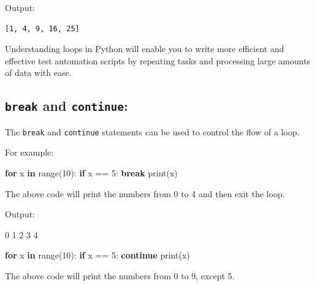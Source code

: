 \documentclass[
  paper=a4,
  ,captions=tableheading
]{scrartcl}
\newenvironment{Shaded}{}{}
\newcommand{\BuiltInTok}[1]{\textcolor[rgb]{0.00,0.50,0.00}{#1}}
\newcommand{\ControlFlowTok}[1]{\textcolor[rgb]{0.00,0.44,0.13}{\textbf{#1}}}
\newcommand{\DecValTok}[1]{\textcolor[rgb]{0.25,0.63,0.44}{#1}}
\newcommand{\ExtensionTok}[1]{#1}
\newcommand{\KeywordTok}[1]{\textcolor[rgb]{0.00,0.44,0.13}{\textbf{#1}}}
\newcommand{\NormalTok}[1]{#1}
\newcommand{\OperatorTok}[1]{\textcolor[rgb]{0.40,0.40,0.40}{#1}}
\begin{document}
Output:

\begin{verbatim}
[1, 4, 9, 16, 25]
\end{verbatim}

Understanding loops in Python will enable you to write more efficient
and effective test automation scripts by repeating tasks and processing
large amounts of data with ease.

\hypertarget{break-and-continue}{%
\subsection{\texorpdfstring{\texttt{break} and
\texttt{continue}:}{break and continue:}}\label{break-and-continue}}

The \texttt{break} and \texttt{continue} statements can be used to
control the flow of a loop.

For example:

\begin{Shaded}
\begin{Highlighting}[]
\ControlFlowTok{for}\NormalTok{ x }\KeywordTok{in} \BuiltInTok{range}\NormalTok{(}\DecValTok{10}\NormalTok{):}
    \ControlFlowTok{if}\NormalTok{ x }\OperatorTok{==} \DecValTok{5}\NormalTok{:}
        \ControlFlowTok{break}
    \BuiltInTok{print}\NormalTok{(x)}
\end{Highlighting}
\end{Shaded}

The above code will print the numbers from 0 to 4 and then exit the
loop.

Output:

\begin{Shaded}
\begin{Highlighting}[]
\ExtensionTok{0}
\ExtensionTok{1}
\ExtensionTok{2}
\ExtensionTok{3}
\ExtensionTok{4}
\end{Highlighting}
\end{Shaded}

\begin{Shaded}
\begin{Highlighting}[]
\ControlFlowTok{for}\NormalTok{ x }\KeywordTok{in} \BuiltInTok{range}\NormalTok{(}\DecValTok{10}\NormalTok{):}
    \ControlFlowTok{if}\NormalTok{ x }\OperatorTok{==} \DecValTok{5}\NormalTok{:}
        \ControlFlowTok{continue}
    \BuiltInTok{print}\NormalTok{(x)}
\end{Highlighting}
\end{Shaded}

The above code will print the numbers from 0 to 9, except 5.
\end{document}
